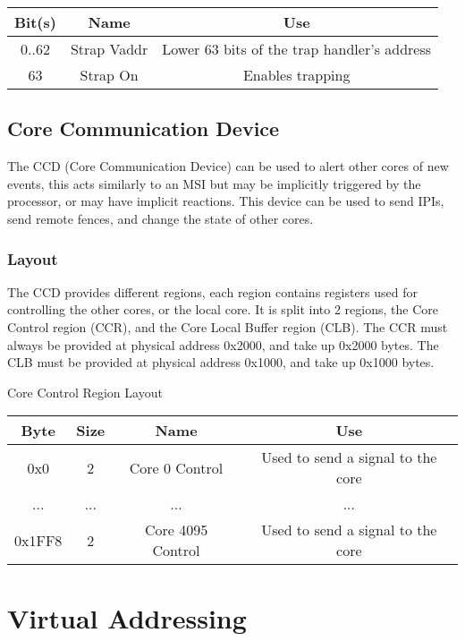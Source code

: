 \documentclass{article}
\begin{document}
\begin{center}
\begin{tabular}{ |c|c|c| }
    \hline
    Bit(s) & Name & Use \\
    \hline
    0..62 & Strap Vaddr & Lower 63 bits of the trap handler's address \\
    \hline
    63 & Strap On & Enables trapping\footnotemark[1] \\
    \hline
\end{tabular}
\end{center}

\subsection{Core Communication Device}
The CCD (Core Communication Device) can be used to alert other cores of new events, this acts similarly to an MSI but may be implicitly triggered by the processor, or may have implicit reactions.
This device can be used to send IPIs, send remote fences, and change the state of other cores.

\subsubsection{Layout}
The CCD provides different regions, each region contains registers used for controlling the other cores, or the local core. It is split into 2 regions, the Core Control region (CCR), and the Core Local Buffer region (CLB).
The CCR must always be provided at physical address 0x2000, and take up 0x2000 bytes. The CLB must be provided at physical address 0x1000, and take up 0x1000 bytes.
\begin{center}
Core Control Region Layout
\begin{tabular}{ |c|c|c|c| }
    \hline
    Byte & Size & Name & Use \\
    \hline
    0x0 & 2 & Core 0 Control & Used to send a signal to the core\footnotemark[1] \\
    \hline
    ... & ... & ... & ... \\
    \hline
    0x1FF8 & 2 & Core 4095 Control & Used to send a signal to the core\footnotemark[1] \\
    \hline
\end{tabular}
\end{center}

\section{Virtual Addressing}
\end{document}

